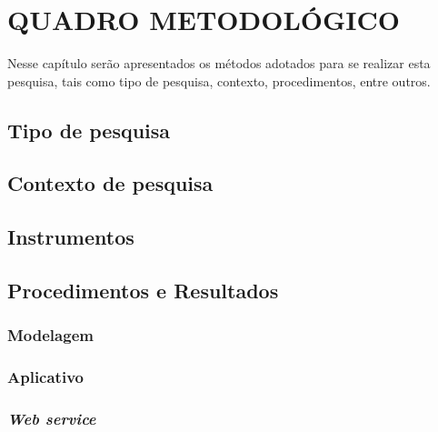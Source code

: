 \chapter{QUADRO METODOLÓGICO}

	\par Nesse capítulo serão apresentados os métodos adotados para se realizar esta
pesquisa, tais como tipo de pesquisa, contexto, procedimentos, entre outros.
	
	\section{Tipo de pesquisa}
		
	
	\section{Contexto de pesquisa}
		
	
	\section{Instrumentos}
		
	
	\section{Procedimentos e Resultados}
		
	
			\subsection{Modelagem}
				
	
			\subsection{Aplicativo}
				
	
			\subsection{\textit{Web service}}	
				
	
